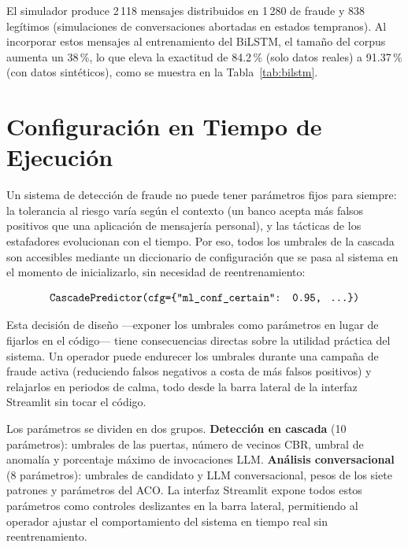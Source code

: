 \documentclass{llncs}
\begin{document}
El simulador produce 2\,118 mensajes distribuidos en 1\,280 de
fraude y 838 legítimos (simulaciones de conversaciones abortadas
en estados tempranos).
Al incorporar estos mensajes al entrenamiento del BiLSTM,
el tamaño del corpus aumenta un 38\,\%, lo que eleva la exactitud
de 84.2\,\% (solo datos reales) a 91.37\,\% (con datos sintéticos),
como se muestra en la Tabla~\ref{tab:bilstm}.

\section{Configuración en Tiempo de Ejecución}
\label{sec:config}

Un sistema de detección de fraude no puede tener parámetros fijos
para siempre: la tolerancia al riesgo varía según el contexto
(un banco acepta más falsos positivos que una aplicación de mensajería
personal), y las tácticas de los estafadores evolucionan con el tiempo.
Por eso, todos los umbrales de la cascada son accesibles mediante
un diccionario de configuración que se pasa al sistema en el momento
de inicializarlo, sin necesidad de reentrenamiento:

\begin{equation}
  \texttt{CascadePredictor(cfg=\{``ml\_conf\_certain'': 0.95,\; \ldots\})}
\end{equation}

Esta decisión de diseño ---exponer los umbrales como parámetros
en lugar de fijarlos en el código--- tiene consecuencias directas
sobre la utilidad práctica del sistema.
Un operador puede endurecer los umbrales durante una campaña de
fraude activa (reduciendo falsos negativos a costa de más falsos
positivos) y relajarlos en periodos de calma, todo desde la
barra lateral de la interfaz Streamlit sin tocar el código.

Los parámetros se dividen en dos grupos.
\textbf{Detección en cascada} (10 parámetros): umbrales de las
puertas, número de vecinos CBR, umbral de anomalía y
porcentaje máximo de invocaciones LLM.
\textbf{Análisis conversacional} (8 parámetros): umbrales de
candidato y LLM conversacional, pesos de los siete patrones y
parámetros del ACO.
La interfaz Streamlit expone todos estos parámetros como
controles deslizantes en la barra lateral, permitiendo al
operador ajustar el comportamiento del sistema en tiempo real
sin reentrenamiento.

\end{document}
